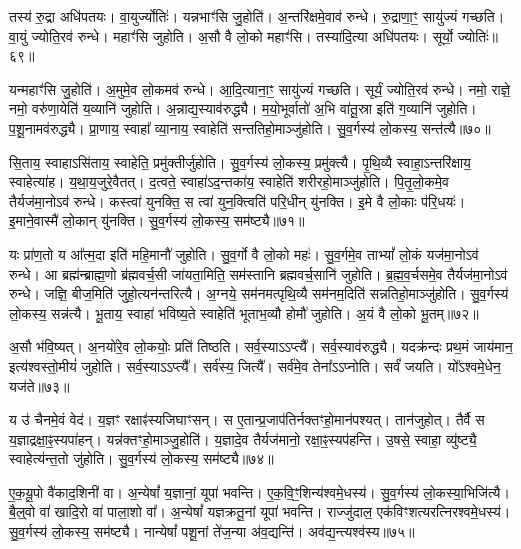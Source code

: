 तस्य॑ रु॒द्रा अधि॑पतयः।
वा॒युर्ज्योतिः॑।
यन्नभाꣳ॑सि जु॒होति॑।
अ॒न्तरि॑क्षमे॒वाव॑ रुन्धे।
रु॒द्राणा॒ꣳ॒ सायु॑ज्यं गच्छति।
वा॒युं ज्योति॒रव॑ रुन्धे।
महाꣳ॑सि जुहोति।
अ॒सौ वै लो॒को महाꣳ॑सि।
तस्या॑दि॒त्या अधि॑पतयः।
सूर्यो॒ ज्योतिः॑॥६९॥\ip

यन्महाꣳ॑सि जु॒होति॑।
अ॒मुमे॒व लो॒कमव॑ रुन्धे।
आ॒दि॒त्याना॒ꣳ॒ सायु॑ज्यं गच्छति।
सूर्यं॒ ज्योति॒रव॑ रुन्धे।
नमो॒ राज्ञे॒ नमो॒ वरु॑णा॒येति॑ य॒व्यानि॑ जुहोति।
अ॒न्नाद्य॒स्या\-व॑\-रुद्ध्यै।
म॒यो॒भूर्वातो॑ अ॒भि वा॑तू॒स्रा इति॑ ग॒व्यानि॑ जुहोति।
प॒शू॒नामव॑रुद्ध्यै।
प्रा॒णाय॒ स्वाहा᳚ व्या॒नाय॒ स्वाहेति॑ सन्ततिहो॒माञ्जु॑होति।
सु॒व॒र्गस्य॑ लो॒कस्य॒ सन्त॑त्यै॥७०॥\ip

सि॒ताय॒ स्वाहा\-ऽसि॑ताय॒ स्वाहेति॒ प्रमु॑क्तीर्जुहोति।
सु॒व॒र्गस्य॑ लो॒कस्य॒ प्रमु॑क्त्यै।
पृ॒थि॒व्यै स्वाहा॒\-ऽन्तरि॑क्षाय॒ स्वाहेत्या॑ह।
य॒था॒\-य॒जु\-रे॒वै\-तत्।
द॒त्वते॒ स्वाहा॑\-ऽद॒न्तका॑य॒ स्वाहेति॑ शरीरहो॒माञ्जु॑होति।
पि॒तृ॒लो॒कमे॒व तैर्यज॑मा॒नोऽव॑ रुन्धे।
कस्त्वा॑ युनक्ति॒ स त्वा॑ युन॒क्त्विति॑ परि॒धीन् यु॑नक्ति।
इ॒मे वै लो॒काः प॑रि॒धयः॑।
इ॒माने॒वास्मै॑ लो॒कान् यु॑नक्ति।
सु॒व॒र्गस्य॑ लो॒कस्य॒ सम॑ष्ट्यै॥७१॥\ip

यः प्रा॑ण॒तो य आ᳚त्म॒दा इति॑ महि॒मानौ॑ जुहोति।
सु॒व॒र्गो वै लो॒को महः॑।
सु॒व॒र्गमे॒व ताभ्यां᳚ लो॒कं यज॑मा॒नोऽव॑ रुन्धे।
आ ब्रह्म॑न्ब्राह्म॒णो ब्र॑ह्म\-वर्च॒सी जा॑यता॒मिति॒ सम॑स्तानि ब्रह्मवर्च॒सानि॑ जुहोति।
ब्र॒ह्म॒व॒र्चसमे॒व तैर्यज॑मा॒नोऽव॑ रुन्धे।
जज्ञि॒ बीज॒मिति॑ जुहो॒त्यन॑न्तरित्यै।
अ॒ग्नये॒ सम॑नमत्पृथि॒व्यै सम॑नम॒दिति॑ सन्नतिहो॒माञ्जु॑होति।
सु॒व॒र्गस्य॑ लो॒कस्य॒ सन्न॑त्यै।
भू॒ताय॒ स्वाहा॑ भविष्य॒ते स्वाहेति॑ भूताभ॒व्यौ होमौ॑ जुहोति।
अ॒यं वै लो॒को भू॒तम्॥७२॥\ip

अ॒सौ भ॑वि॒ष्यत्।
अ॒नयो॑रे॒व लो॒कयोः॒ प्रति॑ तिष्ठति।
सर्व॒स्याऽऽप्त्यै᳚।
सर्व॒स्या\-व॑\-रुद्ध्यै।
यदक्र॑न्दः प्रथ॒मं जाय॑मान॒ इत्य॑श्वस्तो॒मीयं॑ जुहोति।
सर्व॒स्याऽऽप्त्यै᳚।
सर्व॑स्य॒ जित्यै᳚।
सर्व॑मे॒व तेना᳚ऽऽप्नोति।
सर्वं॑ जयति।
यो᳚ऽश्वमे॒धेन॒ यज॑ते॥७३॥\ip

य उ॑ चैनमे॒वं वेद॑।
य॒ज्ञꣳ रक्षाꣴ॑स्यजिघाꣳसन्।
स ए॒तान्प्र॒जा\-प॑तिर्नक्तꣳहो॒मान॑पश्यत्।
तान॑जुहोत्।
तैर्वै स य॒ज्ञाद्रक्षा॒ꣴ॒स्यपा॑हन्।
यन्न॑क्तꣳहो॒माञ्जु॒होति॑।
य॒ज्ञादे॒व तैर्यज॑मानो॒ रक्षा॒ꣴ॒स्यप॑हन्ति।
उ॒षसे॒ स्वाहा॒ व्यु॑ष्ट्यै॒ स्वाहेत्य॑न्त॒तो जु॑होति।
सु॒व॒र्गस्य॑ लो॒कस्य॒ सम॑ष्ट्यै॥७४॥\ip\anuvakamend[वै नभाꣳ॑सि॒ सूर्यो॒ ज्योतिः॒ सन्त॑त्यै॒ सम॑ष्ट्यै भू॒तं यज॑ते॒ नव॑ च]

ए॒क॒यू॒पो वै॑काद॒शिनी॑ वा।
अ॒न्येषां᳚ य॒ज्ञानां॒ यूपा॑ भवन्ति।
ए॒क॒वि॒ꣳ॒शिन्य॑श्वमे॒धस्य॑।
सु॒व॒र्गस्य॑ लो॒कस्या॒भिजि॑त्यै।
बै॒ल्॒वो वा॑ खादि॒रो वा॑ पाला॒शो वा᳚।
अ॒न्येषां᳚ यज्ञक्रतू॒नां यूपा॑ भवन्ति।
राज्जु॑दाल॒ एक॑विꣳशत्यरत्निरश्वमे॒धस्य॑।
सु॒व॒र्गस्य॑ लो॒कस्य॒ सम॑ष्ट्यै।
नान्येषां᳚ पशू॒नां ते॑ज॒न्या अ॑व॒द्यन्ति॑।
अव॑द्य॒न्त्यश्व॑स्य॥७५॥\ip

